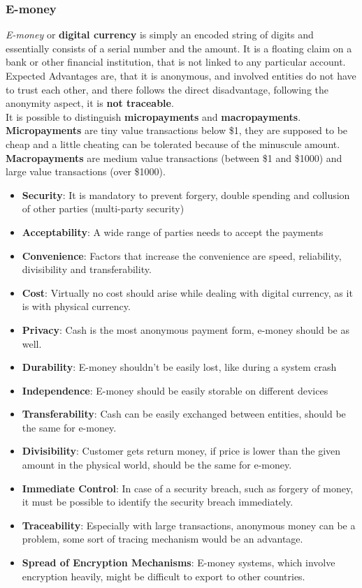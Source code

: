 \documentclass[a4paper, 10 pt, conference]{ieeeconf}
\begin{document}
\subsubsection{\textbf{E-money}}
\emph{E-money} or \textbf{digital currency} is simply an encoded string of digits and essentially consists of a serial number and the amount. 
It is a floating claim on a bank or other financial institution, that is not linked to any particular account. Expected Advantages are, that it is anonymous, and involved entities do not have to trust each other, and there follows the direct disadvantage, following the anonymity aspect, it is \textbf{not traceable}. \\
It is possible to distinguish \textbf{micropayments} and \textbf{macropayments}. \\
\textbf{Micropayments} are tiny value transactions below \$1, they are supposed to be cheap and a little cheating can be tolerated because of the minuscule amount. \\
\textbf{Macropayments} are medium value transactions (between \$1 and \$1000) and large value transactions (over \$1000). 
\begin{itemize}
\item \textbf{Security}: It is mandatory to prevent forgery, double spending and collusion of other parties (multi-party security)
\item \textbf{Acceptability}: A wide range of parties needs to accept the payments
\item \textbf{Convenience}: Factors that increase the convenience are speed, reliability, divisibility and transferability.
\item \textbf{Cost}: Virtually no cost should arise while dealing with digital currency, as it is with physical currency. 
\item \textbf{Privacy}: Cash is the most anonymous payment form, e-money should be as well. 
\item \textbf{Durability}: E-money shouldn't be easily lost, like during a system crash
\item \textbf{Independence}: E-money should be easily storable on different devices
\item \textbf{Transferability}: Cash can be easily exchanged between entities, should be the same for e-money.
\item \textbf{Divisibility}: Customer gets return money, if price is lower than the given amount in the physical world, should be the same for e-money.
\item \textbf{Immediate Control}: In case of a security breach, such as forgery of money, it must be possible to identify the security breach immediately. 
\item \textbf{Traceability}: Especially with large transactions, anonymous money can be a problem, some sort of tracing mechanism would be an advantage.
\item \textbf{Spread of Encryption Mechanisms}: E-money systems, which involve encryption heavily, might be difficult to export to other countries. 
\end{itemize}
\end{document}
